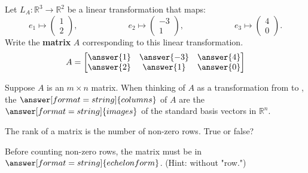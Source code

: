 \documentclass{ximera}
\begin{document}
\begin{problem}
  Let $L_A:{\mathbb R}^3\to {\mathbb R}^2$ be a linear transformation that maps:
  \[
  e_1\mapsto \begin{pmatrix} 1\\ 2 \end{pmatrix},\hspace{1in} 
  e_2\mapsto \begin{pmatrix} -3\\ 1 \end{pmatrix},\hspace{1in} 
  e_3\mapsto \begin{pmatrix} 4\\ 0 \end{pmatrix}.
        \]
        Write the \textbf{matrix} $A$ corresponding to this linear
        transformation.
  \[
  A=\begin{bmatrix} \answer{1} &  \answer{-3} &  \answer{4} \\ 
       \answer{2} &  \answer{1} &  \answer{0}\end{bmatrix}
  \]
        
\end{problem}


\begin{question}
Suppose $A$ is an $m\times n$ matrix.  When thinking of $A$ as a transformation from
 to 
, the 
$\answer[format=string]{columns}$ of $A$ are the $\answer[format=string]{images}$ of the 
standard basis vectors in ${\mathbb R}^n$. 
\end{question}

\begin{question}
The rank of a matrix is the number of non-zero rows. True or false?  
\begin{multipleChoice}
\end{multipleChoice}
\begin{question}
Before counting non-zero rows, the matrix must be in $\answer[format=string]{echelon form}$. (Hint: without "row.")
\end{question}
\end{question}




%
%
%
\end{document}
